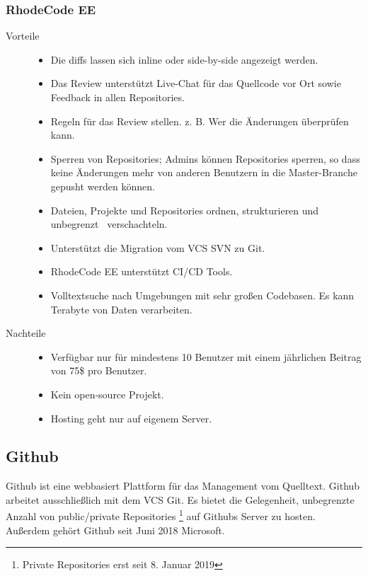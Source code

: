 \subsubsection{RhodeCode EE}
\label{subsubsec:RhodeCode EE}

\begin{description}
	\item [Vorteile] \hfill
		\begin{itemize}
			\item Die diffs lassen sich inline oder side-by-side angezeigt werden.
			\item Das Review unterstützt Live-Chat für das Quellcode vor Ort sowie Feedback in allen Repositories.
			\item Regeln für das Review stellen. z. B. Wer die Änderungen überprüfen kann.
			\item Sperren von Repositories; Admins können Repositories sperren, so dass keine Änderungen mehr von anderen Benutzern in die Master-Branche gepusht werden können.
			\item Dateien, Projekte und Repositories ordnen, strukturieren und unbegrenzt \, verschachteln.
			\item Unterstützt die Migration vom \ac{VCS} \ac{SVN} zu Git.
			\item RhodeCode EE unterstützt \ac{CI}/\ac{CD} Tools.
			\item Volltextsuche nach Umgebungen mit sehr großen Codebasen. Es kann Terabyte von Daten verarbeiten.
		\end{itemize}
		
	\item [Nachteile] \hfill
		\begin{itemize}
			\item Verfügbar nur für mindestens 10 Benutzer mit einem jährlichen Beitrag von 75\$ pro Benutzer.
			\item Kein open-source Projekt.
			\item Hosting geht nur auf eigenem Server.
		\end{itemize}
		
\end{description}

\subsection{Github}
\label{subsec:Github}

Github ist eine webbasiert Plattform für das Management vom Quelltext. Github arbeitet ausschließlich mit dem \ac{VCS} Git. Es bietet die Gelegenheit, unbegrenzte Anzahl von public/private Repositories \footnote{Private Repositories erst seit 8. Januar 2019} auf Githubs Server zu hosten. Außerdem gehört Github seit Juni 2018 Microsoft.


